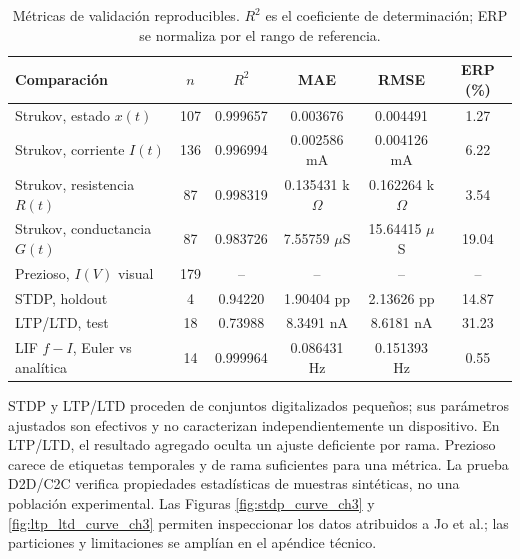\begin{table}[H]
\centering
\footnotesize
\caption{M\'etricas de validaci\'on reproducibles. $R^2$ es el coeficiente de determinaci\'on; ERP se normaliza por el rango de referencia.}
\label{tab:metricas_validacion}
\begin{tabularx}{\textwidth}{X c c c c c}
\toprule
Comparaci\'on & $n$ & $R^2$ & MAE & RMSE & ERP (\%)\\
\midrule
Strukov, estado $x(t)$ &107&0.999657&0.003676&0.004491&1.27\\
Strukov, corriente $I(t)$ &136&0.996994&0.002586 mA&0.004126 mA&6.22\\
Strukov, resistencia $R(t)$ &87&0.998319&0.135431 k$\Omega$&0.162264 k$\Omega$&3.54\\
Strukov, conductancia $G(t)$ &87&0.983726&7.55759 $\mu$S&15.64415 $\mu$S&19.04\\
Prezioso, $I(V)$ visual &179&--&--&--&--\\
STDP, holdout &4&0.94220&1.90404 pp&2.13626 pp&14.87\\
LTP/LTD, test &18&0.73988&8.3491 nA&8.6181 nA&31.23\\
LIF $f-I$, Euler vs anal\'itica &14&0.999964&0.086431 Hz&0.151393 Hz&0.55\\
\bottomrule
\end{tabularx}
\end{table}

STDP y LTP/LTD proceden de conjuntos digitalizados peque\~nos; sus par\'ametros
ajustados son efectivos y no caracterizan independientemente un dispositivo.
En LTP/LTD, el resultado agregado oculta un ajuste deficiente por rama.
Prezioso carece de etiquetas temporales y de rama suficientes para una
m\'etrica. La prueba D2D/C2C verifica propiedades estad\'isticas de muestras
sint\'eticas, no una poblaci\'on experimental. Las Figuras
\ref{fig:stdp_curve_ch3} y \ref{fig:ltp_ltd_curve_ch3} permiten inspeccionar
los datos atribuidos a Jo et al.; las particiones y limitaciones se ampl\'ian
en el ap\'endice t\'ecnico.

